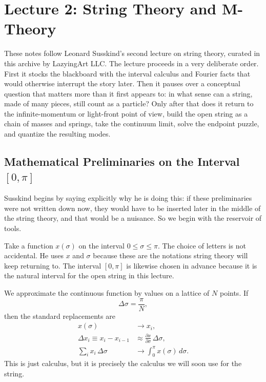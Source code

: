 \chapter{Lecture 2: String Theory and M-Theory}

These notes follow Leonard Susskind's second lecture on string theory, curated in this archive by LazyingArt LLC. The lecture proceeds in a very deliberate order. First it stocks the blackboard with the interval calculus and Fourier facts that would otherwise interrupt the story later. Then it pauses over a conceptual question that matters more than it first appears to: in what sense can a string, made of many pieces, still count as a particle? Only after that does it return to the infinite-momentum or light-front point of view, build the open string as a chain of masses and springs, take the continuum limit, solve the endpoint puzzle, and quantize the resulting modes.

\section{Mathematical Preliminaries on the Interval $[0,\pi]$}

Susskind begins by saying explicitly why he is doing this: if these preliminaries were not written down now, they would have to be inserted later in the middle of the string theory, and that would be a nuisance. So we begin with the reservoir of tools.

Take a function \(x(\sigma)\) on the interval \(0\leq \sigma \leq \pi\). The choice of letters is not accidental. He uses \(x\) and \(\sigma\) because these are the notations string theory will keep returning to. The interval \([0,\pi]\) is likewise chosen in advance because it is the natural interval for the open string in this lecture.

We approximate the continuous function by values on a lattice of \(N\) points. If
\begin{equation}
\Delta \sigma=\frac{\pi}{N},
\end{equation}
then the standard replacements are
\begin{align}
x(\sigma) &\longrightarrow x_i, \\
\Delta x_i \equiv x_i-x_{i-1} &\approx \frac{\partial x}{\partial \sigma}\,\Delta \sigma, \\
\sum_i x_i\,\Delta \sigma &\longrightarrow \int_0^\pi x(\sigma)\,d\sigma .
\end{align}
This is just calculus, but it is precisely the calculus we will soon use for the string.

